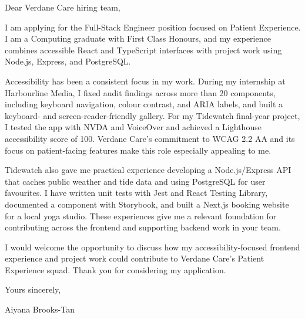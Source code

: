 \documentclass[11pt,a4paper]{article}
\begin{document}
Dear Verdane Care hiring team,

I am applying for the Full-Stack Engineer position focused on Patient Experience. I am a Computing graduate with First Class Honours, and my experience combines accessible React and TypeScript interfaces with project work using Node.js, Express, and PostgreSQL.

Accessibility has been a consistent focus in my work. During my internship at Harbourline Media, I fixed audit findings across more than 20 components, including keyboard navigation, colour contrast, and ARIA labels, and built a keyboard- and screen-reader-friendly gallery. For my Tidewatch final-year project, I tested the app with NVDA and VoiceOver and achieved a Lighthouse accessibility score of 100. Verdane Care's commitment to WCAG 2.2 AA and its focus on patient-facing features make this role especially appealing to me.

Tidewatch also gave me practical experience developing a Node.js/Express API that caches public weather and tide data and using PostgreSQL for user favourites. I have written unit tests with Jest and React Testing Library, documented a component with Storybook, and built a Next.js booking website for a local yoga studio. These experiences give me a relevant foundation for contributing across the frontend and supporting backend work in your team.

I would welcome the opportunity to discuss how my accessibility-focused frontend experience and project work could contribute to Verdane Care's Patient Experience squad. Thank you for considering my application.

Yours sincerely,

Aiyana Brooks-Tan
\end{document}
